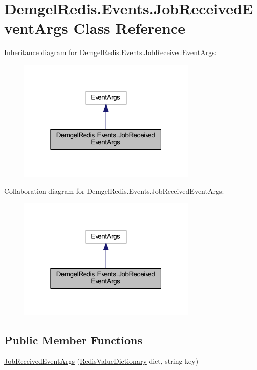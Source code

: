 \hypertarget{class_demgel_redis_1_1_events_1_1_job_received_event_args}{}\section{Demgel\+Redis.\+Events.\+Job\+Received\+Event\+Args Class Reference}
\label{class_demgel_redis_1_1_events_1_1_job_received_event_args}


Inheritance diagram for Demgel\+Redis.\+Events.\+Job\+Received\+Event\+Args\+:
\nopagebreak
\begin{figure}[H]
\begin{center}
\leavevmode
\includegraphics[width=244pt]{class_demgel_redis_1_1_events_1_1_job_received_event_args__inherit__graph}
\end{center}
\end{figure}


Collaboration diagram for Demgel\+Redis.\+Events.\+Job\+Received\+Event\+Args\+:
\nopagebreak
\begin{figure}[H]
\begin{center}
\leavevmode
\includegraphics[width=244pt]{class_demgel_redis_1_1_events_1_1_job_received_event_args__coll__graph}
\end{center}
\end{figure}
\subsection*{Public Member Functions}
\begin{DoxyCompactItemize}
\item 
\hyperlink{class_demgel_redis_1_1_events_1_1_job_received_event_args_af4c499cf04c620e2a88605e7714784f6}{Job\+Received\+Event\+Args} (\hyperlink{class_demgel_redis_1_1_job_queue_1_1_redis_value_dictionary}{Redis\+Value\+Dictionary} dict, string key)
\end{DoxyCompactItemize}

